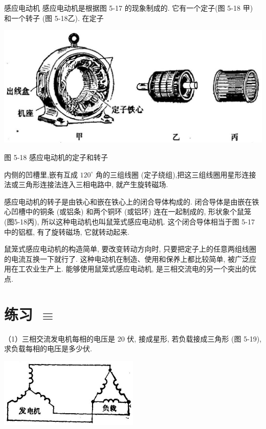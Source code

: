 \documentclass[10pt]{article}
\begin{document}
感应电动机 感应电动机是根据图 5-17 的现象制成的. 它有一个定子(图 5-18 甲) 和一个转子 (图 5-18乙). 在定子

\begin{center}
\includegraphics[max width=1.0\textwidth]{images/01913056-1f15-74d8-9184-9aab52c9d66b_177_485789.jpg}
\end{center}

图 5-18 感应电动机的定子和转子

内侧的凹槽里,嵌有互成 \({120}^{ \circ }\) 角的三组线圈 (定子绕组),把这三组线圈用星形连接法或三角形连接法连入三相电路中, 就产生旋转磁场.

感应电动机的转子是由铁心和嵌在铁心上的闭合导体构成的. 闭合导体是由嵌在铁心凹槽中的铜条 (或铝条) 和两个铜环 (或铝环) 连在一起制成的, 形状象个鼠笼 (图5-18丙), 所以这种电动机也叫鼠笼式感应电动机. 这个闭合导体相当于图 5-17 中的铝框, 有了旋转磁场, 它就转动起来.

鼠笼式感应电动机的构造简单, 要改变转动方向时, 只要把定子上的任意两组线圈的电流互换一下就行了. 这种电动机在制造、使用和保养上都比较简单, 被广泛应用在工农业生产上. 能够使用鼠笼式感应电动机, 是三相交流电的另一个突出的优点.

\section*{练习 \(\equiv\)}

（1）三相交流发电机每相的电压是 20 伏, 接成星形, 若负载接成三角形 (图 5-19), 求负载每相的电压是多少伏.

\begin{center}
\includegraphics[max width=0.5\textwidth]{images/01913056-1f15-74d8-9184-9aab52c9d66b_178_870218.jpg}
\end{center}
\end{document}

